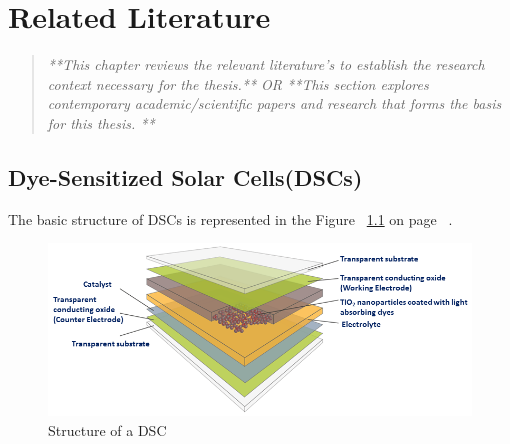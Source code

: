 \chapter{Related Literature}
\begin{quote} 
\textit{ **This chapter reviews the relevant literature's to establish the research context necessary for the thesis.** OR **This section explores contemporary academic/scientific papers and research that forms the basis for this thesis. ** } 
\end{quote}


  
\section{Dye-Sensitized Solar Cells(DSCs)}

The basic structure of \ac{DSCs} is represented in the Figure ~\ref{fig:DSC_struc} on page ~\pageref{fig:DSC_struc}. 

\begin{figure}[H]
\begin{center}
\includegraphics[width=\textwidth]{images/DSCs_struc}
\caption{Structure of a DSC }
\label{fig:DSC_struc}
\end{center}
\end{figure}

